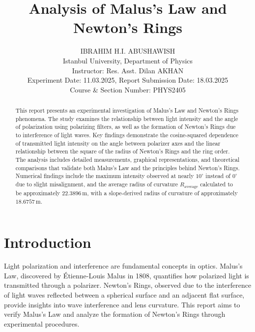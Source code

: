 \documentclass[journal]{IEEEtran}
\begin{document}
 
\title{Analysis of Malus's Law and Newton's Rings}
\author{IBRAHIM H.I. ABUSHAWISH \\
Istanbul University, Department of Physics \\
Instructor: Res. Asst. Dilan AKHAN \\
Experiment Date: 11.03.2025, Report Submission Date: 18.03.2025\\
Course \& Section Number: PHYS2405}


\maketitle


\begin{abstract}
    This report presents an experimental investigation of Malus's Law and Newton's Rings phenomena. The study examines the relationship between light intensity and the angle of polarization using polarizing filters, as well as the formation of Newton's Rings due to interference of light waves. Key findings demonstrate the cosine-squared dependence of transmitted light intensity on the angle between polarizer axes and the linear relationship between the square of the radius of Newton's Rings and the ring order. The analysis includes detailed measurements, graphical representations, and theoretical comparisons that validate both Malus's Law and the principles behind Newton's Rings. Numerical findings include the maximum intensity observed at nearly $10^\circ$ instead of $0^\circ$ due to slight misalignment, and the average radius of curvature $R_{\text{average}}$ calculated to be approximately $22.3896 \, \text{m}$, with a slope-derived radius of curvature of approximately $18.6757 \, \text{m}$.
\end{abstract}

\section{Introduction}
Light polarization and interference are fundamental concepts in optics. Malus's Law, discovered by Étienne-Louis Malus in 1808, quantifies how polarized light is transmitted through a polarizer. Newton's Rings, observed due to the interference of light waves reflected between a spherical surface and an adjacent flat surface, provide insights into wave interference and lens curvature. This report aims to verify Malus's Law and analyze the formation of Newton's Rings through experimental procedures.
\end{document}
